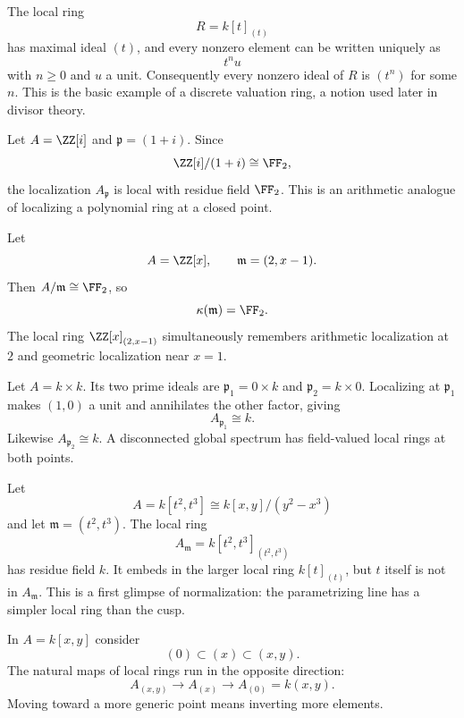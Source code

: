 \begin{example}
The local ring
\[
R=k[t]_{(t)}
\]
has maximal ideal $(t)$, and every nonzero element can be written uniquely as
\[
t^n u
\]
with $n\ge0$ and $u$ a unit.  Consequently every nonzero ideal of $R$ is $(t^n)$ for some
$n$.  This is the basic example of a discrete valuation ring, a notion used later in divisor
theory.
\end{example}

\begin{example}
Let $A=\ZZ[i]$ and $\mathfrak p=(1+i)$.  Since
\[
\ZZ[i]/(1+i)\cong\FF_2,
\]
the localization $A_{\mathfrak p}$ is local with residue field $\FF_2$.  This is an arithmetic
analogue of localizing a polynomial ring at a closed point.
\end{example}

\begin{example}
Let
\[
A=\ZZ[x],\qquad \mathfrak m=(2,x-1).
\]
Then $A/\mathfrak m\cong\FF_2$, so
\[
\kappa(\mathfrak m)=\FF_2.
\]
The local ring $\ZZ[x]_{(2,x-1)}$ simultaneously remembers arithmetic localization at $2$
and geometric localization near $x=1$.
\end{example}

\begin{example}
Let $A=k\times k$.  Its two prime ideals are $\mathfrak p_1=0\times k$ and
$\mathfrak p_2=k\times0$.  Localizing at $\mathfrak p_1$ makes $(1,0)$ a unit and annihilates
the other factor, giving
\[
A_{\mathfrak p_1}\cong k.
\]
Likewise $A_{\mathfrak p_2}\cong k$.  A disconnected global spectrum has field-valued local
rings at both points.
\end{example}

\begin{example}
Let
\[
A=k[t^2,t^3]\cong k[x,y]/(y^2-x^3)
\]
and let $\mathfrak m=(t^2,t^3)$.  The local ring
\[
A_{\mathfrak m}=k[t^2,t^3]_{(t^2,t^3)}
\]
has residue field $k$.  It embeds in the larger local ring $k[t]_{(t)}$, but $t$ itself is
not in $A_{\mathfrak m}$.  This is a first glimpse of normalization: the parametrizing line
has a simpler local ring than the cusp.
\end{example}

\begin{example}
In $A=k[x,y]$ consider
\[
(0)\subset(x)\subset(x,y).
\]
The natural maps of local rings run in the opposite direction:
\[
A_{(x,y)}\longrightarrow A_{(x)}\longrightarrow A_{(0)}=k(x,y).
\]
Moving toward a more generic point means inverting more elements.
\end{example}

